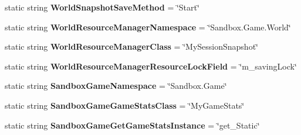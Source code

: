 \begin{DoxyCompactItemize}
\item 
\hypertarget{class_s_e_mod_a_p_i_internal_1_1_a_p_i_1_1_common_1_1_world_manager_a218300497d8ec8cd3758f1eae142d672}{}static string {\bfseries World\+Snapshot\+Save\+Method} = \char`\"{}Start\char`\"{}\label{class_s_e_mod_a_p_i_internal_1_1_a_p_i_1_1_common_1_1_world_manager_a218300497d8ec8cd3758f1eae142d672}

\item 
\hypertarget{class_s_e_mod_a_p_i_internal_1_1_a_p_i_1_1_common_1_1_world_manager_a22489c01da58ba89f8eb5d50ea291328}{}static string {\bfseries World\+Resource\+Manager\+Namespace} = \char`\"{}Sandbox.\+Game.\+World\char`\"{}\label{class_s_e_mod_a_p_i_internal_1_1_a_p_i_1_1_common_1_1_world_manager_a22489c01da58ba89f8eb5d50ea291328}

\item 
\hypertarget{class_s_e_mod_a_p_i_internal_1_1_a_p_i_1_1_common_1_1_world_manager_aca5e8904c9b44d1c50675cfd5dea0bf5}{}static string {\bfseries World\+Resource\+Manager\+Class} = \char`\"{}My\+Session\+Snapshot\char`\"{}\label{class_s_e_mod_a_p_i_internal_1_1_a_p_i_1_1_common_1_1_world_manager_aca5e8904c9b44d1c50675cfd5dea0bf5}

\item 
\hypertarget{class_s_e_mod_a_p_i_internal_1_1_a_p_i_1_1_common_1_1_world_manager_abbac25c027f7c98308bbdc5b54106320}{}static string {\bfseries World\+Resource\+Manager\+Resource\+Lock\+Field} = \char`\"{}m\+\_\+saving\+Lock\char`\"{}\label{class_s_e_mod_a_p_i_internal_1_1_a_p_i_1_1_common_1_1_world_manager_abbac25c027f7c98308bbdc5b54106320}

\item 
\hypertarget{class_s_e_mod_a_p_i_internal_1_1_a_p_i_1_1_common_1_1_world_manager_a5fbd77292625602474069c8a33a20e08}{}static string {\bfseries Sandbox\+Game\+Namespace} = \char`\"{}Sandbox.\+Game\char`\"{}\label{class_s_e_mod_a_p_i_internal_1_1_a_p_i_1_1_common_1_1_world_manager_a5fbd77292625602474069c8a33a20e08}

\item 
\hypertarget{class_s_e_mod_a_p_i_internal_1_1_a_p_i_1_1_common_1_1_world_manager_af936f8405f3d6825d47a5f24d8ff4108}{}static string {\bfseries Sandbox\+Game\+Game\+Stats\+Class} = \char`\"{}My\+Game\+Stats\char`\"{}\label{class_s_e_mod_a_p_i_internal_1_1_a_p_i_1_1_common_1_1_world_manager_af936f8405f3d6825d47a5f24d8ff4108}

\item 
\hypertarget{class_s_e_mod_a_p_i_internal_1_1_a_p_i_1_1_common_1_1_world_manager_a3f962703e385fbc292eac80b2d04b58b}{}static string {\bfseries Sandbox\+Game\+Get\+Game\+Stats\+Instance} = \char`\"{}get\+\_\+\+Static\char`\"{}\label{class_s_e_mod_a_p_i_internal_1_1_a_p_i_1_1_common_1_1_world_manager_a3f962703e385fbc292eac80b2d04b58b}


\end{DoxyCompactItemize}
